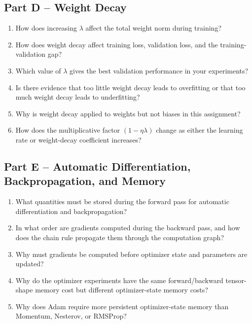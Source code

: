 \documentclass[11pt]{article}
\begin{document}
\subsection*{Part D -- Weight Decay}
\begin{enumerate}
    \item How does increasing $\lambda$ affect the total weight norm during training?
    \item How does weight decay affect training loss, validation loss, and the training-validation gap?
    \item Which value of $\lambda$ gives the best validation performance in your experiments?
    \item Is there evidence that too little weight decay leads to overfitting or that too much weight decay leads to underfitting?
    \item Why is weight decay applied to weights but not biases in this assignment?
    \item How does the multiplicative factor $(1-\eta\lambda)$ change as either the learning rate or weight-decay coefficient increases?
\end{enumerate}

\subsection*{Part E -- Automatic Differentiation, Backpropagation, and Memory}
\begin{enumerate}
    \item What quantities must be stored during the forward pass for automatic differentiation and backpropagation?
    \item In what order are gradients computed during the backward pass, and how does the chain rule propagate them through the computation graph?
    \item Why must gradients be computed before optimizer state and parameters are updated?
    \item Why do the optimizer experiments have the same forward/backward tensor-shape memory cost but different optimizer-state memory costs?
    \item Why does Adam require more persistent optimizer-state memory than Momentum, Nesterov, or RMSProp?
\end{enumerate}
\end{document}
